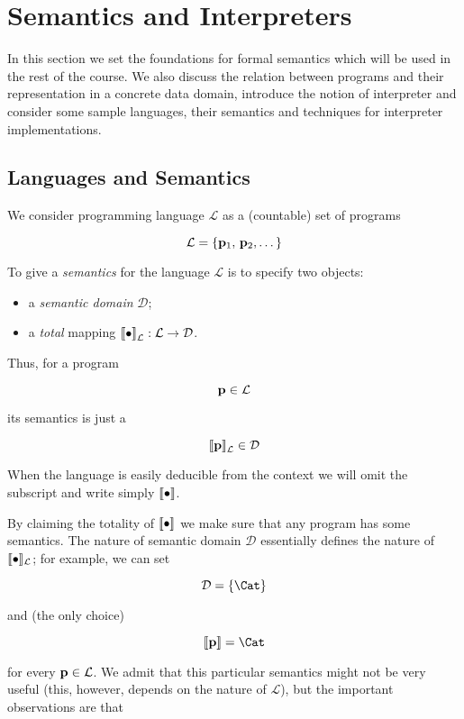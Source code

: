 \chapter{Semantics and Interpreters}

In this section we set the foundations for formal semantics which will be used in the rest of the course. We also discuss the
relation between programs and their representation in a concrete data domain, introduce the notion of interpreter and
consider some sample languages, their semantics and techniques for interpreter implementations.

\section{Languages and Semantics}

We consider programming language $\mathcal L$ as a (countable) set of programs

\[
\mathcal{L}=\{\mathbf{p}_1,\,\mathbf{p}_2,\dots\}
\]

To give a \emph{semantics} for the language $\mathcal L$ is to specify two objects:

\begin{itemize}
\item a \emph{semantic domain} $\mathcal D$;
\item a \emph{total} mapping $\sembr{\bullet}^\ph_{\mathcal L} : \mathcal L \to \mathcal D$.
\end{itemize}

Thus, for a program

\[
\mathbf{p}\in\mathcal L
\]

its semantics is just a

\[
\sembr{\primi{p}}^\ph_{\mathcal L}\in\mathcal D
\]

When the language is easily deducible from the context we will omit the subscript and write simply $\llbracket{\bullet}\rrbracket$.

By claiming the totality of $\llbracket{\bullet}\rrbracket$ we
make sure that any program has some semantics. The nature of semantic domain $\mathcal D$ essentially defines the nature of $\llbracket{\bullet}\rrbracket_{\mathcal L}$;
for example, we can set

\[
\mathcal D=\{\Cat\}
\]

and (the only choice)

\[
\sembr{\primi{p}}=\Cat
\]

for every $\mathbf{p}\in\mathcal L$. We admit that this particular
semantics might not be very useful (this, however, depends on the nature of $\mathcal L$), but the important observations are that

